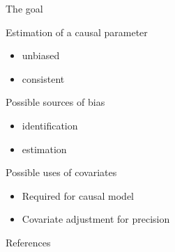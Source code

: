 \documentclass[xcolor={table}, handout]{beamer}
\begin{document}

\begin{frame}{The goal}

\begin{wideitemize}
\item Estimation of a causal parameter\pause
\begin{itemize}
\item unbiased\pause
\item consistent\pause
\end{itemize}
\item Possible sources of bias\pause
\begin{itemize}
\item identification
\item estimation\pause
\end{itemize}
\item Possible uses of covariates\pause
\begin{itemize}
\item Required for causal model
\item Covariate adjustment for precision 
\end{itemize}
\end{wideitemize}

\end{frame}





\backupbegin

\nocite{schuler2017targeted,chernozhukov2018double}
\begin{frame}[allowframebreaks]{References}
    
    
\end{frame}
\backupend
\end{document}
